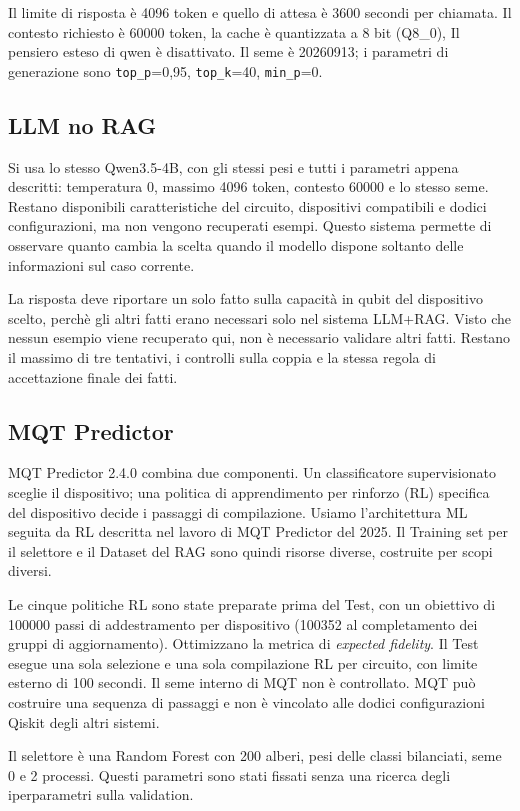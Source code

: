 Il limite di risposta è 4096 token e quello di attesa è 3600 secondi per
chiamata. Il contesto richiesto è 60000 token, la cache è quantizzata a 8 bit (Q8\_0),
Il pensiero esteso di qwen è disattivato.
Il seme è 20260913; i parametri di generazione sono
\texttt{top\_p}=0,95, \texttt{top\_k}=40, \texttt{min\_p}=0.

\subsection{LLM no RAG}
Si usa lo stesso Qwen3.5-4B, con gli stessi pesi e tutti i parametri appena
descritti: temperatura 0, massimo 4096 token, contesto 60000 e lo stesso seme.
Restano disponibili caratteristiche del circuito, dispositivi compatibili
e dodici configurazioni, ma non vengono recuperati esempi.
Questo sistema permette di osservare quanto cambia la scelta quando
il modello dispone soltanto delle informazioni sul caso corrente.

La risposta deve riportare un solo fatto sulla capacità in qubit del
dispositivo scelto, perchè gli altri fatti erano necessari solo nel sistema LLM+RAG.
Visto che nessun esempio viene recuperato qui, non è necessario validare altri fatti.
Restano il massimo di tre tentativi, i controlli sulla
coppia e la stessa regola di accettazione finale dei fatti.

\subsection{MQT Predictor}
MQT Predictor 2.4.0 combina due componenti. Un classificatore supervisionato
sceglie il dispositivo; una politica di apprendimento per rinforzo (RL)
specifica del dispositivo decide i passaggi di compilazione.
Usiamo l'architettura ML seguita da RL descritta nel lavoro di MQT Predictor del 2025.
Il Training set per il selettore e il Dataset del RAG sono quindi risorse
diverse, costruite per scopi diversi.

Le cinque politiche RL sono state preparate prima del Test, con un obiettivo
di 100000 passi di addestramento per dispositivo (100352 al completamento
dei gruppi di aggiornamento). Ottimizzano la metrica di \emph{expected fidelity}.
Il Test esegue una sola selezione e una sola compilazione RL per circuito,
con limite esterno di 100 secondi. Il seme interno di MQT non è controllato.
MQT può costruire una sequenza di passaggi e non è vincolato alle dodici
configurazioni Qiskit degli altri sistemi.

Il selettore è una Random Forest con 200 alberi, pesi delle classi bilanciati, seme 0 e 2 processi. Questi parametri sono stati fissati senza una ricerca degli iperparametri sulla validation. 

